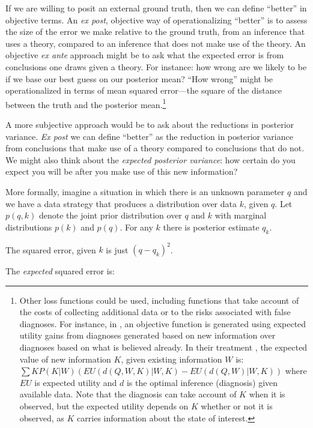 \documentclass[
  12pt,
]{book}
\begin{document}
If we are willing to posit an external ground truth, then we can define ``better'' in objective terms. An \emph{ex post}, objective way of operationalizing ``better'' is to assess the size of the error we make relative to the ground truth, from an inference that uses a theory, compared to an inference that does not make use of the theory. An objective \emph{ex ante} approach might be to ask what the expected error is from conclusions one draws given a theory. For instance: how wrong are we likely to be if we base our best guess on our posterior mean? ``How wrong'' might be operationalized in terms of mean squared error---the square of the distance between the truth and the posterior mean.\footnote{Other loss functions could be used, including functions that take account of the costs of collecting additional data or to the risks associated with false diagnoses. For instance, in \citet{heckerman1991toward}, an objective function is generated using expected utility gains from diagnoses generated based on new information over diagnoses based on what is believed already. In their treatment \citep[Equation 6]{heckerman1991toward}, the expected value of new information \(K\), given existing information \(W\) is: \(\sum{K}P(K|W)( EU(d(Q,W,K)|W, K) - EU(d(Q, W)|W, K))\) where \(EU\) is expected utility and \(d\) is the optimal inference (diagnosis) given available data. Note that the diagnosis can take account of \(K\) when it is observed, but the expected utility depends on \(K\) whether or not it is observed, as \(K\) carries information about the state of interest.}

A more subjective approach would be to ask about the reductions in posterior variance. \emph{Ex post} we can define ``better'' as the reduction in posterior variance from conclusions that make use of a theory compared to conclusions that do not. We might also think about the \emph{expected posterior variance}: how certain do you expect you will be after you make use of this new information?

More formally, imagine a situation in which there is an unknown parameter \(q\) and we have a data strategy that produces a distribution over data \(k\), given \(q\). Let \(p(q,k)\) denote the joint prior distribution over \(q\) and \(k\) with marginal distributions \(p(k)\) and \(p(q)\). For any \(k\) there is posterior estimate \(q_k\).

The squared error, given \(k\) is just \((q - q_k)^2\).

The \emph{expected} squared error is:
\end{document}
